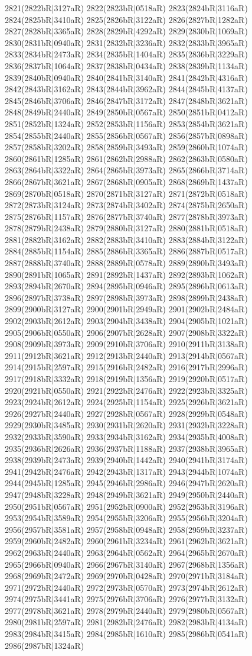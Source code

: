 2821(2822bR|3127aR) 2822(2823bR|0518aR) 2823(2824bR|3116aR) 2824(2825bR|3410aR) 2825(2826bR|3122aR) 2826(2827bR|1282aR) 2827(2828bR|3365aR) 2828(2829bR|4292aR) 2829(2830bR|1069aR) 2830(2831bR|0940aR) 2831(2832bR|3236aR) 2832(2833bR|3965aR) 2833(2834bR|2473aR) 2834(2835bR|1404aR) 2835(2836bR|3229aR) 2836(2837bR|1064aR) 2837(2838bR|0434aR) 2838(2839bR|1134aR) 2839(2840bR|0940aR) 2840(2841bR|3140aR) 2841(2842bR|4316aR) 2842(2843bR|3162aR) 2843(2844bR|3962aR) 2844(2845bR|4137aR) 2845(2846bR|3706aR) 2846(2847bR|3172aR) 2847(2848bR|3621aR) 2848(2849bR|2440aR) 2849(2850bR|0567aR) 2850(2851bR|0412aR) 2851(2852bR|1324aR) 2852(2853bR|1156aR) 2853(2854bR|3621aR) 2854(2855bR|2440aR) 2855(2856bR|0567aR) 2856(2857bR|0898aR) 2857(2858bR|3202aR) 2858(2859bR|3493aR) 2859(2860bR|1074aR) 2860(2861bR|1285aR) 2861(2862bR|2988aR) 2862(2863bR|0580aR) 2863(2864bR|3322aR) 2864(2865bR|3973aR) 2865(2866bR|3714aR) 2866(2867bR|3621aR) 2867(2868bR|0905aR) 2868(2869bR|1437aR) 2869(2870bR|0518aR) 2870(2871bR|3127aR) 2871(2872bR|0518aR) 2872(2873bR|3124aR) 2873(2874bR|3402aR) 2874(2875bR|2650aR) 2875(2876bR|1157aR) 2876(2877bR|3740aR) 2877(2878bR|3973aR) 2878(2879bR|2438aR) 2879(2880bR|3127aR) 2880(2881bR|0518aR) 2881(2882bR|3162aR) 2882(2883bR|3410aR) 2883(2884bR|3122aR) 2884(2885bR|1154aR) 2885(2886bR|3365aR) 2886(2887bR|0517aR) 2887(2888bR|3740aR) 2888(2889bR|0578aR) 2889(2890bR|3493aR) 2890(2891bR|1065aR) 2891(2892bR|1437aR) 2892(2893bR|1062aR) 2893(2894bR|2670aR) 2894(2895bR|0946aR) 2895(2896bR|0613aR) 2896(2897bR|3738aR) 2897(2898bR|3973aR) 2898(2899bR|2438aR) 2899(2900bR|3127aR) 2900(2901bR|2949aR) 2901(2902bR|2484aR) 2902(2903bR|2612aR) 2903(2904bR|3438aR) 2904(2905bR|1021aR) 2905(2906bR|0550aR) 2906(2907bR|2628aR) 2907(2908bR|3322aR) 2908(2909bR|3973aR) 2909(2910bR|3706aR) 2910(2911bR|3138aR) 2911(2912bR|3621aR) 2912(2913bR|2440aR) 2913(2914bR|0567aR) 2914(2915bR|2597aR) 2915(2916bR|2482aR) 2916(2917bR|2996aR) 2917(2918bR|3332aR) 2918(2919bR|1356aR) 2919(2920bR|0517aR) 2920(2921bR|0550aR) 2921(2922bR|2476aR) 2922(2923bR|3325aR) 2923(2924bR|2612aR) 2924(2925bR|1154aR) 2925(2926bR|3621aR) 2926(2927bR|2440aR) 2927(2928bR|0567aR) 2928(2929bR|0548aR) 2929(2930bR|3485aR) 2930(2931bR|2620aR) 2931(2932bR|3228aR) 2932(2933bR|3590aR) 2933(2934bR|3162aR) 2934(2935bR|4008aR) 2935(2936bR|2626aR) 2936(2937bR|1188aR) 2937(2938bR|3965aR) 2938(2939bR|2473aR) 2939(2940bR|1442aR) 2940(2941bR|3174aR) 2941(2942bR|2476aR) 2942(2943bR|1317aR) 2943(2944bR|1074aR) 2944(2945bR|1285aR) 2945(2946bR|2986aR) 2946(2947bR|2620aR) 2947(2948bR|3228aR) 2948(2949bR|3621aR) 2949(2950bR|2440aR) 2950(2951bR|0567aR) 2951(2952bR|0900aR) 2952(2953bR|3196aR) 2953(2954bR|3589aR) 2954(2955bR|3206aR) 2955(2956bR|3204aR) 2956(2957bR|3581aR) 2957(2958bR|0948aR) 2958(2959bR|3237aR) 2959(2960bR|2482aR) 2960(2961bR|3234aR) 2961(2962bR|3621aR) 2962(2963bR|2440aR) 2963(2964bR|0562aR) 2964(2965bR|2670aR) 2965(2966bR|0940aR) 2966(2967bR|3140aR) 2967(2968bR|1356aR) 2968(2969bR|2472aR) 2969(2970bR|0428aR) 2970(2971bR|3184aR) 2971(2972bR|2440aR) 2972(2973bR|0570aR) 2973(2974bR|2612aR) 2974(2975bR|3441aR) 2975(2976bR|3706aR) 2976(2977bR|3132aR) 2977(2978bR|3621aR) 2978(2979bR|2440aR) 2979(2980bR|0567aR) 2980(2981bR|2597aR) 2981(2982bR|2476aR) 2982(2983bR|4134aR) 2983(2984bR|3415aR) 2984(2985bR|1610aR) 2985(2986bR|0541aR) 2986(2987bR|1324aR) 